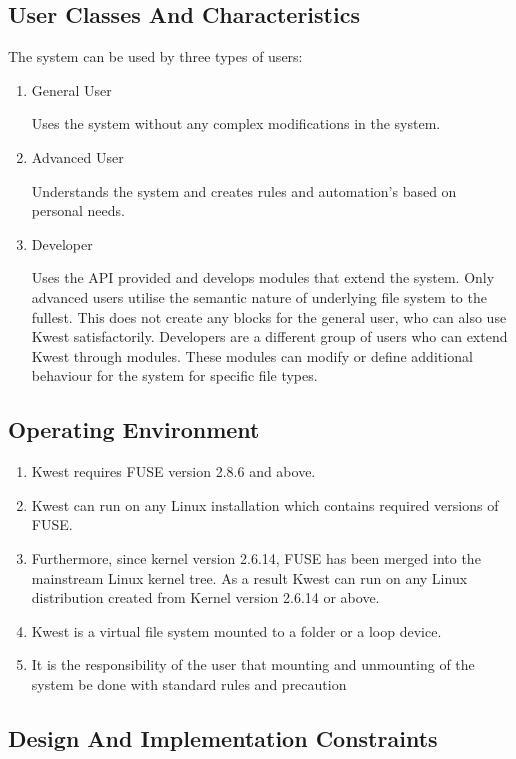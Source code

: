 \subsection{User Classes And Characteristics} 

The system can be used by three types of users:
\begin{enumerate}
\item General User 

Uses the system without any complex modifications in the system.
\item Advanced User 

Understands the system and creates rules and automation’s based on personal needs.
\item Developer 

Uses the API provided and develops modules that extend the system.
Only advanced users utilise the semantic nature of underlying file system to the fullest.
This does not create any blocks for the general user, who can also use Kwest satisfactorily.
Developers are a different group of users who can extend Kwest through modules. These
modules can modify or define additional behaviour for the system for specific file types.
\end{enumerate}

\subsection{Operating Environment}\begin{enumerate}
\item  Kwest requires FUSE \cite{FUSE} version 2.8.6 and above.

\item Kwest can run on any Linux installation which contains required versions of FUSE.
\item  Furthermore, since kernel version 2.6.14, FUSE has been merged into the
mainstream Linux kernel tree. As a result Kwest can run on any Linux distribution
created from Kernel version 2.6.14 or above.

\item Kwest is a virtual file system mounted to a folder or a loop device.
\item It is the responsibility of the user that mounting and unmounting of the system be
done with standard rules and precaution

\end{enumerate}

\subsection{Design And Implementation Constraints}

